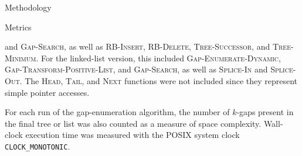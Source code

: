 \documentclass{article}
\begin{document}
\begin{section}{Methodology}
\begin{subsection}{Metrics}
\begin{paragraph}{}
      and \textsc{Gap-Search}, as well as \textsc{RB-Insert}, \textsc{RB-Delete},
      \textsc{Tree-Successor}, and \textsc{Tree-Minimum}. For the linked-list
      version, this included \textsc{Gap-Enumerate-Dynamic}, \textsc{Gap-Transform-Positive-List},
      and \textsc{Gap-Search}, as well as \textsc{Splice-In} and \textsc{Splice-Out}.
      The \textsc{Head}, \textsc{Tail}, and \textsc{Next} functions were not included
      since they represent simple pointer accesses.
    \end{paragraph}
    \begin{paragraph}{}
      For each run of the gap-enumeration algorithm, the number of $k$-gaps present in
      the final tree or list was also counted as a measure of space complexity.
      Wall-clock execution time was measured with the POSIX system clock \texttt{CLOCK\_MONOTONIC}.
    \end{paragraph}
  \end{subsection}
\end{section}
\end{document}
